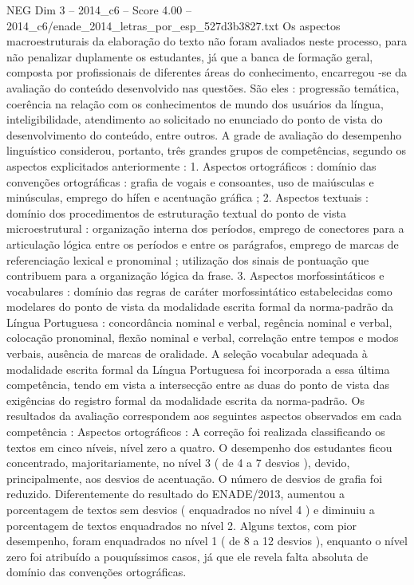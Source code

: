 \begin{textsample}{NEG Dim 3 – 2014\_c6 – Score 4.00 – 2014\_c6/enade\_2014\_letras\_por\_esp\_527d3b3827.txt}
Os aspectos macroestruturais da elaboração do texto não foram avaliados neste processo, para não penalizar duplamente os estudantes, já que a banca de formação geral, composta por profissionais de diferentes áreas do conhecimento, encarregou -se da avaliação do conteúdo desenvolvido nas questões.
São eles : progressão temática, coerência na relação com os conhecimentos de mundo dos usuários da língua, inteligibilidade, atendimento ao solicitado no enunciado do ponto de vista do desenvolvimento do conteúdo, entre outros.
A grade de avaliação do desempenho linguístico considerou, portanto, três grandes grupos de competências, segundo os aspectos explicitados anteriormente : 1.
Aspectos ortográficos : domínio das convenções ortográficas : grafia de vogais e consoantes, uso de maiúsculas e minúsculas, emprego do hífen e acentuação gráfica ; 2.
Aspectos textuais : domínio dos procedimentos de estruturação textual do ponto de vista microestrutural : organização interna dos períodos, emprego de conectores para a articulação lógica entre os períodos e entre os parágrafos, emprego de marcas de referenciação lexical e pronominal ; utilização dos sinais de pontuação que contribuem para a organização lógica da frase. 3.
Aspectos morfossintáticos e vocabulares : domínio das regras de caráter morfossintático estabelecidas como modelares do ponto de vista da modalidade escrita formal da norma-padrão da Língua Portuguesa : concordância nominal e verbal, regência nominal e verbal, colocação pronominal, flexão nominal e verbal, correlação entre tempos e modos verbais, ausência de marcas de oralidade.
A seleção vocabular adequada à modalidade escrita formal da Língua Portuguesa foi incorporada a essa última competência, tendo em vista a intersecção entre as duas do ponto de vista das exigências do registro formal da modalidade escrita da norma-padrão.
Os resultados da avaliação correspondem aos seguintes aspectos observados em cada competência : Aspectos ortográficos : A correção foi realizada classificando os textos em cinco níveis, nível zero a quatro.
O desempenho dos estudantes ficou concentrado, majoritariamente, no nível 3 ( de 4 a 7 desvios ), devido, principalmente, aos desvios de acentuação.
O número de desvios de grafia foi reduzido.
Diferentemente do resultado do ENADE/2013, aumentou a porcentagem de textos sem desvios ( enquadrados no nível 4 ) e diminuiu a porcentagem de textos enquadrados no nível 2.
Alguns textos, com pior desempenho, foram enquadrados no nível 1 ( de 8 a 12 desvios ), enquanto o nível zero foi atribuído a pouquíssimos casos, já que ele revela falta absoluta de domínio das convenções ortográficas.

\end{textsample}

